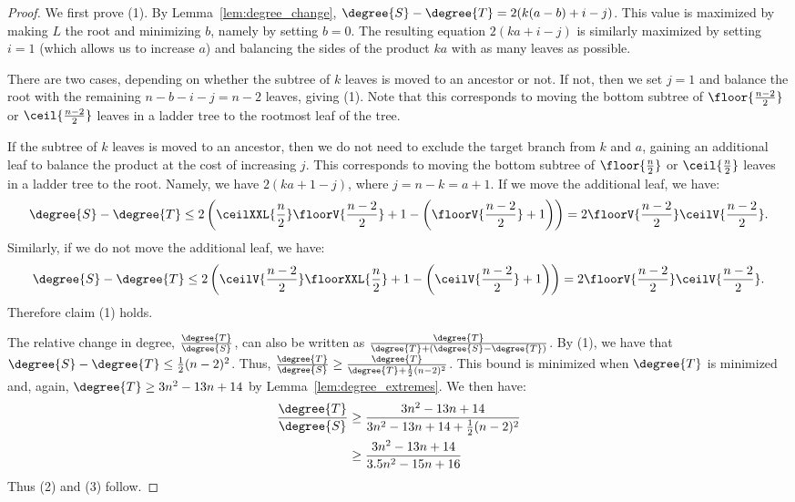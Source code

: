 \documentclass{amsart}
\begin{document}
\begin{proof}
	We first prove (1).
	By Lemma~\ref{lem:degree_change}, $\degree{S} - \degree{T} = 2(k(a-b) + i - j)$.
	This value is maximized by making $L$ the root and minimizing $b$, namely by setting $b=0$.
	The resulting equation $2(ka + i - j)$ is similarly maximized by setting $i=1$ (which allows us to increase $a$) and balancing the sides of the product $ka$ with as many leaves as possible.

	There are two cases, depending on whether the subtree of $k$ leaves is moved to an ancestor or not.
    If not, then we set $j=1$ and balance the root with the remaining $n-b-i-j = n-2$ leaves, giving (1).
	Note that this corresponds to moving the bottom subtree of $\floor{\frac{n-2}{2}}$ or $\ceil{\frac{n-2}{2}}$ leaves in a ladder tree to the rootmost leaf of the tree.

	If the subtree of $k$ leaves is moved to an ancestor, then we do not need to exclude the target branch from $k$ and $a$, gaining an additional leaf to balance the product at the cost of increasing $j$.
	This corresponds to moving the bottom subtree of $\floor{\frac{n}{2}}$ or $\ceil{\frac{n}{2}}$ leaves in a ladder tree to the root.
	Namely, we have $2(ka + 1 - j)$, where $j = n - k = a + 1$.
	If we move the additional leaf, we have:
$$\degree{S} - \degree{T} \le 2\left(\ceilXXL{\frac{n}{2}}\floorV{\frac{n-2}{2}}  + 1 - \left(\floorV{\frac{n-2}{2}} + 1\right)\right) = 2\floorV{\frac{n-2}{2}}\ceilV{\frac{n-2}{2}}.$$
Similarly, if we do not move the additional leaf, we have:
$$\degree{S} - \degree{T} \le 2 \left(\ceilV{\frac{n-2}{2}}\floorXXL{\frac{n}{2}} +1 -  \left(\ceilV{\frac{n-2}{2}} + 1\right)\right) = 2\floorV{\frac{n-2}{2}}\ceilV{\frac{n-2}{2}}.$$
Therefore claim (1) holds.

The relative change in degree, $\frac{\degree{T}}{\degree{S}}$, can also be written as $\frac{\degree{T}}{\degree{T} + (\degree{S} - \degree{T})}$.
By (1), we have that $\degree{S} - \degree{T} \le \frac{1}{2} (n-2)^2 $.
Thus, $\frac{\degree{T}}{\degree{S}} \ge \frac{\degree{T}}{\degree{T} + \frac{1}{2} (n-2)^2} $.
This bound is minimized when $\degree{T}$ is minimized and, again, $\degree{T} \ge 3n^2 - 13n + 14$ by Lemma~\ref{lem:degree_extremes}.
	We then have:
	\begin{align*}
		\frac{\degree{T}}{\degree{S}} &\ge \frac{3n^2 - 13n + 14}{3n^2 - 13n + 14 + \frac{1}{2}(n-2)^2} \\
		&\ge \frac{3n^2 - 13n + 14}{3.5n^2 - 15n + 16}
	\end{align*}
	Thus (2) and (3) follow.

\end{proof}
\end{document}
